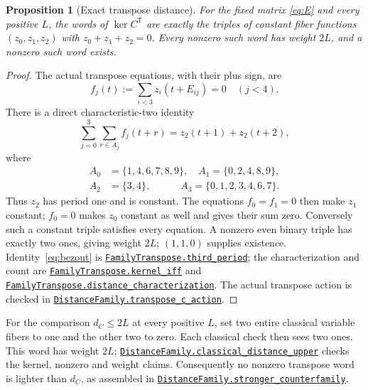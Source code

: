 \documentclass[11pt]{article}
\makeatletter
\newtheorem{proposition}[theorem]{Proposition}
\theoremstyle{definition}\newtheorem{definition}[theorem]{Definition}
\newcommand{\proofcommit}{98eb91cd9049e6a88887a5ba79150ad96a4a3e53}
\newcommand{\proofbase}{https://github.com/alectionary/vibe-math/blob/\proofcommit/formalization/distance-preservation}
\newcommand{\lean}[2]{\href{\proofbase/#1.lean\#L\csname leanline@#2\endcsname}{\nolinkurl{#2}}}
\makeatother
\begin{document}
\begin{proposition}[Exact transpose distance]\label{prop:transpose}
For the fixed matrix \eqref{eq:E} and every positive $L$, the words
of $\ker C^{\mathsf T}$ are exactly the triples of constant fiber
functions $(z_0,z_1,z_2)$ with $z_0+z_1+z_2=0$.
Every nonzero such word has weight $2L$, and a nonzero such word exists.
\end{proposition}
\begin{proof}
The actual transpose equations, with their plus sign, are
\[
 f_j(t):=\sum_{i<3}z_i(t+E_{ij})=0\quad(j<4).
\]
There is a direct characteristic-two identity
\begin{equation}\label{eq:bezout}
 \sum_{j=0}^3\sum_{r\in A_j} f_j(t+r)=z_2(t+1)+z_2(t+2),
\end{equation}
where
\[
\begin{split}
 A_0&=\{1,4,6,7,8,9\},\quad A_1=\{0,2,4,8,9\},\\
 A_2&=\{3,4\},\qquad\quad A_3=\{0,1,2,3,4,6,7\}.
\end{split}
\]
Thus $z_2$ has period one and is constant. The equations $f_0=f_1=0$
then make $z_1$ constant; $f_0=0$ makes $z_0$ constant as well and
gives their sum zero. Conversely such a constant triple satisfies
every equation. A nonzero even binary triple has exactly two ones,
giving weight $2L$; $(1,1,0)$ supplies existence.
Identity~\eqref{eq:bezout} is
\lean{FamilyTranspose}{FamilyTranspose.third_period}; the characterization
and count are
\lean{TransposeConstant}{FamilyTranspose.kernel_iff} and
\lean{TransposeDistance}{FamilyTranspose.distance_characterization}.
The actual transpose action is checked in
\lean{FamilyBounds}{DistanceFamily.transpose_c_action}.
\end{proof}

For the comparison $d_C\leq2L$ at every positive $L$, set two entire
classical variable fibers to one and the other two to zero. Each
classical check then sees two ones. This word has weight $2L$;
\lean{FamilyBounds}{DistanceFamily.classical_distance_upper} checks the
kernel, nonzero and weight claims. Consequently no nonzero transpose
word is lighter than $d_C$, as assembled in
\lean{FamilyBounds}{DistanceFamily.stronger_counterfamily}.
\end{document}
